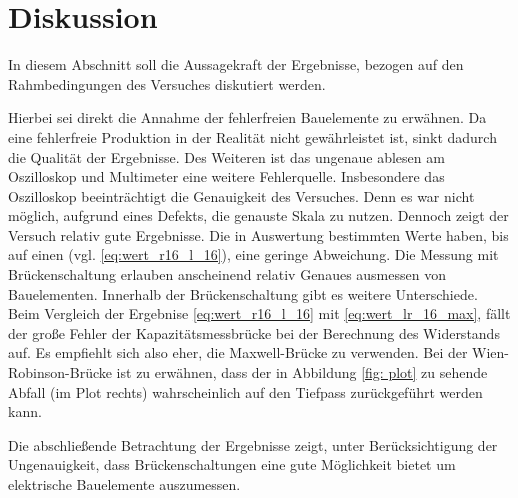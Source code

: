 \section{Diskussion}
In diesem Abschnitt soll die Aussagekraft der Ergebnisse, bezogen auf den
Rahmbedingungen des Versuches diskutiert werden.

Hierbei sei direkt die Annahme der fehlerfreien Bauelemente zu erwähnen.
Da eine fehlerfreie Produktion in der Realität nicht gewährleistet ist, 
sinkt dadurch die Qualität der Ergebnisse.
Des Weiteren ist das ungenaue ablesen am Oszilloskop und Multimeter eine 
weitere Fehlerquelle.
Insbesondere das Oszilloskop beeinträchtigt die Genauigkeit des Versuches.
Denn es war nicht möglich, aufgrund eines Defekts, die genauste 
Skala zu nutzen.
Dennoch zeigt der Versuch relativ gute Ergebnisse. 
Die in Auswertung bestimmten Werte haben, bis auf einen (vgl. \eqref{eq:wert_r16_l_16}), eine geringe Abweichung.
Die Messung mit Brückenschaltung erlauben anscheinend relativ Genaues ausmessen von Bauelementen.
Innerhalb der Brückenschaltung gibt es weitere Unterschiede.
Beim Vergleich der Ergebnise \eqref{eq:wert_r16_l_16} mit \eqref{eq:wert_lr_16_max}, 
fällt der große Fehler der Kapazitätsmessbrücke bei der Berechnung des Widerstands
auf. Es empfiehlt sich also eher, die Maxwell-Brücke zu verwenden.
Bei der Wien-Robinson-Brücke ist zu erwähnen, dass der in Abbildung \ref{fig: plot}
zu sehende Abfall (im Plot rechts) wahrscheinlich auf den Tiefpass zurückgeführt werden
kann.

Die abschließende Betrachtung der Ergebnisse zeigt, unter Berücksichtigung der Ungenauigkeit, 
dass Brückenschaltungen eine gute Möglichkeit bietet um elektrische Bauelemente 
auszumessen.